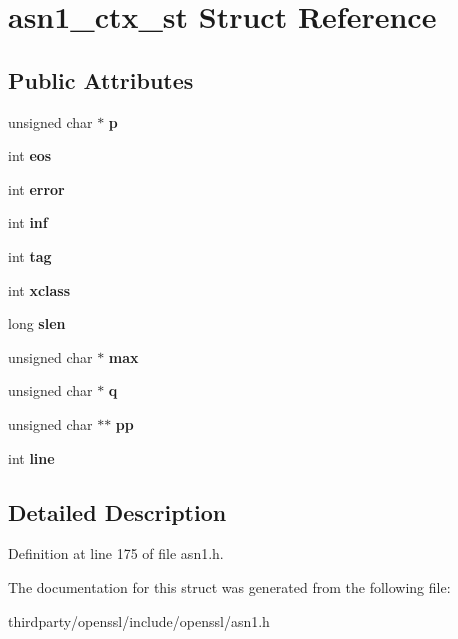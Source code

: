 \hypertarget{structasn1__ctx__st}{}\section{asn1\+\_\+ctx\+\_\+st Struct Reference}
\label{structasn1__ctx__st}
\subsection*{Public Attributes}
\begin{DoxyCompactItemize}
\item 
\mbox{\label{structasn1__ctx__st_a4055e8e978696b3ebe48663e27aaccfd}} 
unsigned char $\ast$ {\bfseries p}
\item 
\mbox{\label{structasn1__ctx__st_acfa7be33fd2e45713f6ae576c929c8fc}} 
int {\bfseries eos}
\item 
\mbox{\label{structasn1__ctx__st_ad615bc5c2f51b7b53714efab6848410e}} 
int {\bfseries error}
\item 
\mbox{\label{structasn1__ctx__st_a3c7aed3d59e1266f44363d75532b3c37}} 
int {\bfseries inf}
\item 
\mbox{\label{structasn1__ctx__st_a50c207efa22cdc9e926f70c3e05ebd8b}} 
int {\bfseries tag}
\item 
\mbox{\label{structasn1__ctx__st_a13d5a9bd152573c46b088acac3f7671f}} 
int {\bfseries xclass}
\item 
\mbox{\label{structasn1__ctx__st_ae23813e92662ef3caff611c92fe51879}} 
long {\bfseries slen}
\item 
\mbox{\label{structasn1__ctx__st_a22989e6f8850b237b7982c8f1c3f27a1}} 
unsigned char $\ast$ {\bfseries max}
\item 
\mbox{\label{structasn1__ctx__st_a2b0e6ae963399039db4a27f09ade7e41}} 
unsigned char $\ast$ {\bfseries q}
\item 
\mbox{\label{structasn1__ctx__st_a1f8419ae235a22405868d87136f3b098}} 
unsigned char $\ast$$\ast$ {\bfseries pp}
\item 
\mbox{\label{structasn1__ctx__st_adc9183c7070fe39aeff12711311c76b4}} 
int {\bfseries line}
\end{DoxyCompactItemize}


\subsection{Detailed Description}


Definition at line 175 of file asn1.\+h.



The documentation for this struct was generated from the following file\+:\begin{DoxyCompactItemize}
\item 
thirdparty/openssl/include/openssl/asn1.\+h\end{DoxyCompactItemize}
